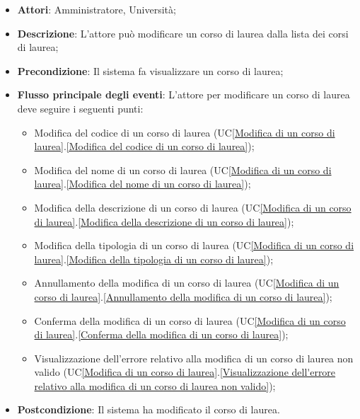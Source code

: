 \begin{itemize}
	\item \textbf{Attori}: Amministratore, Università;
	\item \textbf{Descrizione}: L'attore può modificare un corso di laurea dalla lista dei corsi di laurea;
	
	\item \textbf{Precondizione}: Il sistema fa visualizzare un corso di laurea;
	
	\item \textbf{Flusso principale degli eventi}: L'attore per modificare un corso di laurea deve seguire i seguenti punti:
	
	\begin{itemize}
		\item Modifica del codice di un corso di laurea (UC\ref{Modifica di un corso di laurea}.\ref{Modifica del codice di un corso di laurea});
		\item Modifica del nome di un corso di laurea (UC\ref{Modifica di un corso di laurea}.\ref{Modifica del nome di un corso di laurea});
		\item Modifica della descrizione di un corso di laurea (UC\ref{Modifica di un corso di laurea}.\ref{Modifica della descrizione di un corso di laurea});
		\item Modifica della tipologia di un corso di laurea (UC\ref{Modifica di un corso di laurea}.\ref{Modifica della tipologia di un corso di laurea});
		\item Annullamento della modifica di un corso di laurea (UC\ref{Modifica di un corso di laurea}.\ref{Annullamento della modifica di un corso di laurea});
		\item Conferma della modifica di un corso di laurea (UC\ref{Modifica di un corso di laurea}.\ref{Conferma della modifica di un corso di laurea});
		\item Visualizzazione dell'errore relativo alla modifica di un corso di laurea non valido (UC\ref{Modifica di un corso di laurea}.\ref{Visualizzazione dell'errore relativo alla modifica di un corso di laurea non valido});
	\end{itemize}
	\item \textbf{Postcondizione}: Il sistema ha modificato il corso di laurea.
	
\end{itemize}


